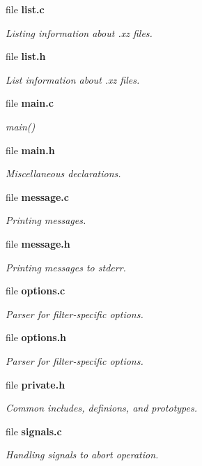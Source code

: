 \begin{DoxyCompactItemize}
file {\bf list.\-c}
\begin{DoxyCompactList}\small\item\em Listing information about .xz files. \end{DoxyCompactList}\item 
file {\bf list.\-h}
\begin{DoxyCompactList}\small\item\em List information about .xz files. \end{DoxyCompactList}\item 
file {\bf main.\-c}
\begin{DoxyCompactList}\small\item\em main() \end{DoxyCompactList}\item 
file {\bf main.\-h}
\begin{DoxyCompactList}\small\item\em Miscellaneous declarations. \end{DoxyCompactList}\item 
file {\bf message.\-c}
\begin{DoxyCompactList}\small\item\em Printing messages. \end{DoxyCompactList}\item 
file {\bf message.\-h}
\begin{DoxyCompactList}\small\item\em Printing messages to stderr. \end{DoxyCompactList}\item 
file {\bf options.\-c}
\begin{DoxyCompactList}\small\item\em Parser for filter-\/specific options. \end{DoxyCompactList}\item 
file {\bf options.\-h}
\begin{DoxyCompactList}\small\item\em Parser for filter-\/specific options. \end{DoxyCompactList}\item 
file {\bf private.\-h}
\begin{DoxyCompactList}\small\item\em Common includes, definions, and prototypes. \end{DoxyCompactList}\item 
file {\bf signals.\-c}
\begin{DoxyCompactList}\small\item\em Handling signals to abort operation. \end{DoxyCompactList}\item 

\end{DoxyCompactItemize}
